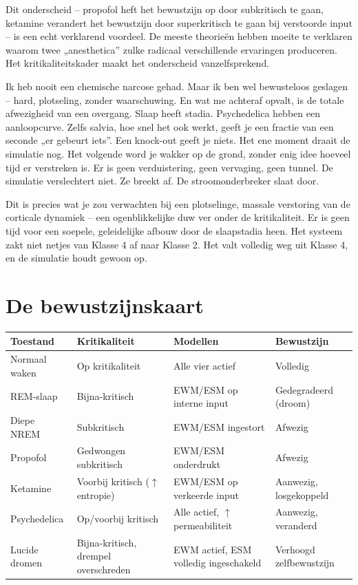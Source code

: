 \documentclass[11pt, twoside, openright]{book}
\begin{document}
Dit onderscheid -- propofol heft het bewustzijn op door subkritisch te gaan, ketamine verandert het bewustzijn door superkritisch te gaan bij verstoorde input -- is een echt verklarend voordeel. De meeste theorieën hebben moeite te verklaren waarom twee „anesthetica” zulke radicaal verschillende ervaringen produceren. Het kritikaliteitskader maakt het onderscheid vanzelfsprekend.

Ik heb nooit een chemische narcose gehad. Maar ik ben wel bewusteloos geslagen -- hard, plotseling, zonder waarschuwing. En wat me achteraf opvalt, is de totale afwezigheid van een overgang. Slaap heeft stadia. Psychedelica hebben een aanloopcurve. Zelfs salvia, hoe snel het ook werkt, geeft je een fractie van een seconde „er gebeurt iets”. Een knock-out geeft je niets. Het ene moment draait de simulatie nog. Het volgende word je wakker op de grond, zonder enig idee hoeveel tijd er verstreken is. Er is geen verduistering, geen vervaging, geen tunnel. De simulatie verslechtert niet. Ze breekt af. De stroomonderbreker slaat door.

Dit is precies wat je zou verwachten bij een plotselinge, massale verstoring van de corticale dynamiek -- een ogenblikkelijke duw ver onder de kritikaliteit. Er is geen tijd voor een soepele, geleidelijke afbouw door de slaapstadia heen. Het systeem zakt niet netjes van Klasse 4 af naar Klasse 2. Het valt volledig weg uit Klasse 4, en de simulatie houdt gewoon op.

\section*{De bewustzijnskaart}


\small
\begin{xltabular}{\linewidth}{X X X X}
\toprule
\textbf{Toestand} & \textbf{Kritikaliteit} & \textbf{Modellen} & \textbf{Bewustzijn} \\
\midrule\endhead
Normaal waken & Op kritikaliteit & Alle vier actief & Volledig \\[4pt]
REM-slaap & Bijna-kritisch & EWM/\allowbreak{}ESM op interne input & Gedegradeerd (droom) \\[4pt]
Diepe NREM & Subkritisch & EWM/\allowbreak{}ESM ingestort & Afwezig \\[4pt]
Propofol & Gedwongen subkritisch & EWM/\allowbreak{}ESM onderdrukt & Afwezig \\[4pt]
Ketamine & Voorbij kritisch ($\uparrow$ entropie) & EWM/\allowbreak{}ESM op verkeerde input & Aanwezig, losgekoppeld \\[4pt]
Psychedelica & Op/\allowbreak{}voorbij kritisch & Alle actief, $\uparrow$ permeabiliteit & Aanwezig, veranderd \\[4pt]
Lucide dromen & Bijna-kritisch, drempel overschreden & EWM actief, ESM volledig ingeschakeld & Verhoogd zelfbewustzijn \\[4pt]
\bottomrule
\end{xltabular}
\normalsize
\end{document}
